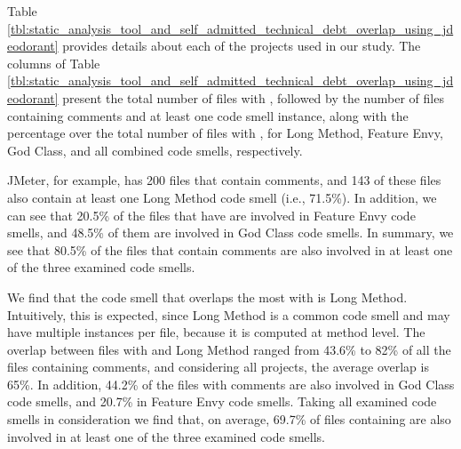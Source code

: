 {Table \ref{tbl:static_analysis_tool_and_self_admitted_technical_debt_overlap_using_jdeodorant} provides details about each of the projects used in our study. The columns of Table \ref{tbl:static_analysis_tool_and_self_admitted_technical_debt_overlap_using_jdeodorant} present the total number of files with \SATD, followed by the number of files containing \SATD comments and at least one code smell instance,
along with the percentage over the total number of files with \SATD, for Long Method, Feature Envy, God Class, and all combined code smells, respectively. 

JMeter, for example, has 200 files that contain \SATD comments, and 143 of these files also contain at least one Long Method code smell (i.e., 71.5\%). In addition, we can see that 20.5\% of the files that have \SATD are involved in Feature Envy code smells, and 48.5\% of them are involved in God Class code smells. In summary, we see that 80.5\% of the files that contain \SATD comments are also involved in at least one of the three examined code smells.     

We find that the code smell that overlaps the most with \SATD is Long Method. Intuitively, this is expected, since Long Method is a common code smell and may have multiple instances per file, because it is computed at method level.
The overlap between files with \SATD and Long Method ranged from 43.6\% to 82\% of all the files containing \SATD comments, and considering all projects, the average overlap is 65\%. In addition, 44.2\% of the files with \SATD comments are also involved in God Class code smells, and 20.7\% in Feature Envy code smells. Taking all examined code smells in consideration we find that, on average, 69.7\% of files containing \SATD are also involved in at least one of the three examined code smells. 

}
